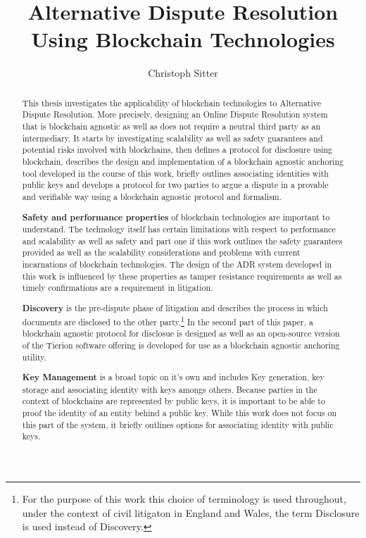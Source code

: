 \documentclass[12pt,msc,a4paper,oneside]{ucl_thesis}
\title{Alternative Dispute Resolution Using Blockchain Technologies}
\author{Christoph Sitter
}
\begin{document}
\maketitle
\makedeclaration


\begin{abstract}
    This thesis investigates the applicability of blockchain technologies to Alternative Dispute Resolution. More precisely, designing an Online Dispute Resolution system that is blockchain agnostic as well as does not require a neutral third party as an intermediary. It starts by investigating scalability as well as safety guarantees and potential risks involved with blockchains, then defines a protocol for disclosure using blockchain, describes the design and implementation of a blockchain agnostic anchoring tool developed in the course of this work, briefly outlines associating identities with public keys and develops a protocol for two parties to argue a dispute in a provable and verifiable way using a blockchain agnostic protocol and formalism.

    \textbf{Safety and performance properties} of blockchain technologies are important to understand. The technology itself has certain limitations with respect to performance and scalability as well as safety and part one if this work outlines the safety guarantees provided as well as the scalability considerations and problems with current incarnations of blockchain technologies. The design of the ADR system developed in this work is influenced by these properties as tamper resistance requirements as well as timely confirmations are a requirement in litigation.

    \textbf{Discovery} is the pre-dispute phase of litigation and describes the process in which documents are disclosed to the other party.\footnote{For the purpose of this work this choice of terminology is used throughout, under the context of civil litigaton in England and Wales, the term Disclosure is used instead of Discovery.} In the second part of this paper, a blockchain agnostic protocol for disclosue is designed as well as an open-source version of the Tierion software offering is developed for use as a blockchain agnostic anchoring utility.

    \textbf{Key Management} is a broad topic on it's own and includes Key generation, key storage and associating identity with keys amongs others. Because parties in the context of blockchains are represented by public keys, it is important to be able to proof the identity of an entity behind a public key. While this work does not focus on this part of the system, it briefly outlines options for associating identity with public keys.


\end{abstract}
\end{document}
